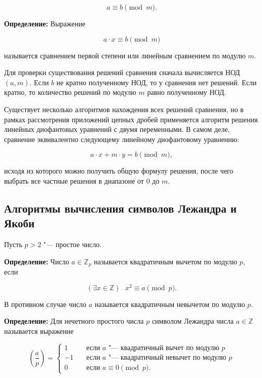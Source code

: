 \documentclass[bachelor, och, labwork]{shiza}
\begin{document}
            $$a \equiv b \pmod m.$$

            \textbf{Определение:} Выражение

            $$a \cdot x \equiv b \pmod m$$

            называется сравнением первой степени или линейным сравнением по
            модулю $m$.
            
            Для проверки существования решений сравнения сначала вычисляется
            НОД$(a, m)$. Если $b$ не кратно полученному НОД, то у сравнения нет
            решений. Если кратно, то количество решений по модулю $m$ равно
            полученному НОД.

            Существует несколько алгоритмов нахождения всех решений сравнения,
            но в рамках рассмотрения приложений цепных дробей применяется
            алгоритм решения линейных диофантовых уравнений с двумя переменными.
            В самом деле, сравнение эквивалентно следующему линейному
            диофантовому уравнению:

            $$a \cdot x + m \cdot y = b \pmod m,$$

            исходя из которого можно получить общую формулу решения, после чего
            выбрать все частные решения в диапазоне от 0 до $m$.

    \subsection{Алгоритмы вычисления символов Лежандра и Якоби}
    
        Пусть $p > 2$ "--- простое число.

        \textbf{Определение:} Число $a \in \mathbb{Z}_p$ называется квадратичным
        вычетом по модулю $p$, если 

        $$(\exists x \in \mathbb{Z}) \text{ } x^2 \equiv a \pmod p.$$

        В противном случае число $a$ называется квадратичным невычетом по модулю
        $p$.

        \textbf{Определение:} Для нечетного простого числа $p$ символом Лежандра
        числа $a \in \mathbb{Z}$ называется выражение

        \[\left(\frac{a}{p}\right) =
            \begin{cases}
                1 & \quad \text{если } a \text{ "--- квадратичный вычет по модулю } p\\
                -1 & \quad \text{если } a \text{ "--- квадратичный невычет по модулю } p\\
                0 & \quad \text{если } a \equiv 0 \pmod p.
            \end{cases}
        \]
\end{document}
